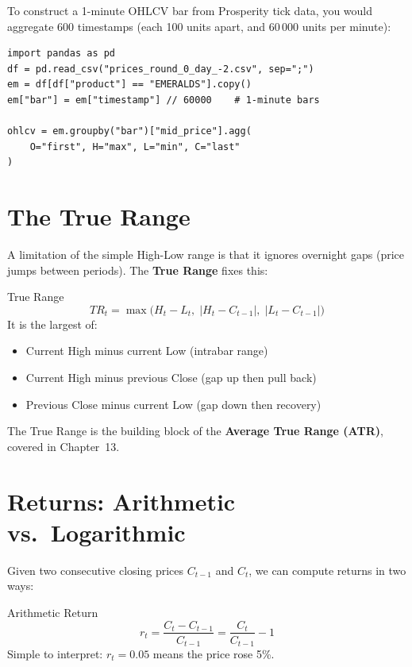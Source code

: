 \documentclass[12pt,a4paper,openany]{report}
\theoremstyle{definition}
\begin{document}
To construct a 1-minute OHLCV bar from Prosperity tick data, you would aggregate 600 timestamps (each 100 units apart, and 60\,000 units per minute):
\begin{lstlisting}[caption={Constructing OHLCV bars from tick data}]
import pandas as pd
df = pd.read_csv("prices_round_0_day_-2.csv", sep=";")
em = df[df["product"] == "EMERALDS"].copy()
em["bar"] = em["timestamp"] // 60000    # 1-minute bars

ohlcv = em.groupby("bar")["mid_price"].agg(
    O="first", H="max", L="min", C="last"
)
\end{lstlisting}

\section{The True Range}

A limitation of the simple High-Low range is that it ignores overnight gaps (price jumps between periods). The \textbf{True Range} fixes this:

\begin{definitionbox}{True Range}
\[
  TR_t = \max\bigl(H_t - L_t,\; |H_t - C_{t-1}|,\; |L_t - C_{t-1}|\bigr)
\]
It is the largest of:
\begin{itemize}
  \item Current High minus current Low (intrabar range)
  \item Current High minus previous Close (gap up then pull back)
  \item Previous Close minus current Low (gap down then recovery)
\end{itemize}
\end{definitionbox}

The True Range is the building block of the \textbf{Average True Range (ATR)}, covered in Chapter~13.

\section{Returns: Arithmetic vs.\ Logarithmic}

Given two consecutive closing prices $C_{t-1}$ and $C_t$, we can compute returns in two ways:

\begin{definitionbox}{Arithmetic Return}
\[
  r_t = \frac{C_t - C_{t-1}}{C_{t-1}} = \frac{C_t}{C_{t-1}} - 1
\]
Simple to interpret: $r_t = 0.05$ means the price rose 5\%.
\end{definitionbox}
\end{document}
